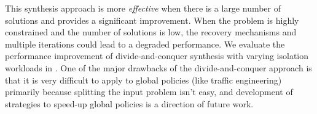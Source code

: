  This synthesis approach is more \emph{effective}
 when there is a large number of solutions and provides a
 significant improvement. When the problem is highly 
 constrained and the number of solutions is low, 
 the recovery mechanisms and multiple iterations could 
 lead to a degraded performance. 
 We evaluate the performance improvement of divide-and-conquer
 synthesis with varying isolation workloads in .
 One of the major drawbacks of the divide-and-conquer approach is that it is very
 difficult to apply to global policies (like traffic engineering) primarily because
 splitting the input problem isn't easy, and development
 of strategies to speed-up global policies is a direction of future work.

 
%
